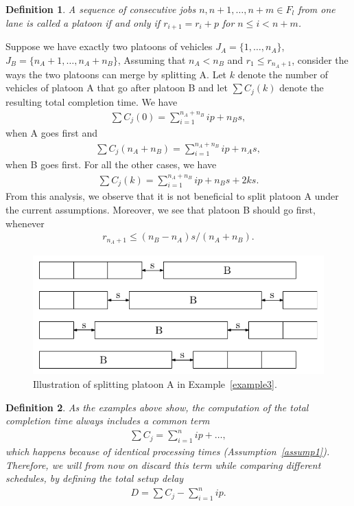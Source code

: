 \documentclass{article}
\theoremstyle{definition}
\theoremstyle{plain}
\newtheorem{define}{Definition}[section]
\begin{document}
%
\begin{define}
  A sequence of consecutive jobs $n, n+1, \dots, n+m \in F_{l}$ from one lane is called a platoon if and only if $r_{i+1} = r_{i} + p$ for $n \leq i < n + m$.
\end{define}
%
\begin{eg}
  \label{example3}
  Suppose we have exactly two platoons of vehicles
  $J_{A} = \{ 1, \dots, n_{A}\}$, $J_{B} = \{ n_{A} + 1, \dots, n_{A} + n_{B}\}$,
  Assuming that
  $n_{A} < n_{B}$ and $r_{1} \leq r_{n_{A}+1}$, consider the ways the two platoons can merge by splitting A.
  Let $k$ denote the number of vehicles of platoon A that go after platoon B and
  let $\sum C_{j}(k)$ denote the resulting total completion time. We have
  \begin{align*}
    \sum C_{j}(0) = \sum_{i=1}^{n_{A}+n_{B}} ip + n_{B}s ,
  \end{align*}
  when A goes first and
  \begin{align*}
    \sum C_{j}(n_{A}+n_{B}) = \sum_{i=1}^{n_{A}+n_{B}} ip + n_{A}s ,
  \end{align*}
  when B goes first. For all the other cases, we have
  \begin{align*}
    \sum C_{j}(k) = \sum_{i=1}^{n_{A}+n_{B}} ip + n_{B}s + 2ks .
  \end{align*}
  From this analysis, we observe that it is not beneficial to split platoon A under the current assumptions. Moreover, we see that platoon B should go first, whenever
  \begin{align*}
    r_{n_{A} + 1} \leq (n_{B} - n_{A}) s / (n_{A} + n_{B}) .
  \end{align*}
\end{eg}
\begin{figure}
  \centering
  \includegraphics{figures/platoons.pdf}
  \caption{Illustration of splitting platoon A in Example~\ref{example3}.}
  \label{fig:example3}
\end{figure}

\begin{define}
  As the examples above show, the computation of the total completion time always includes a common term
  \begin{align*}
    \sum C_{j} = \sum_{i=1}^{n} ip + \dots ,
  \end{align*}
  which happens because of identical processing times
  (Assumption~\ref{assump1}). Therefore, we will from now on discard this term
  while comparing different schedules, by defining the {\normalfont total setup delay}
  \begin{align*}
    D = \sum C_{j} - \sum_{i=1}^{n} ip .
  \end{align*}
\end{define}
\end{document}
